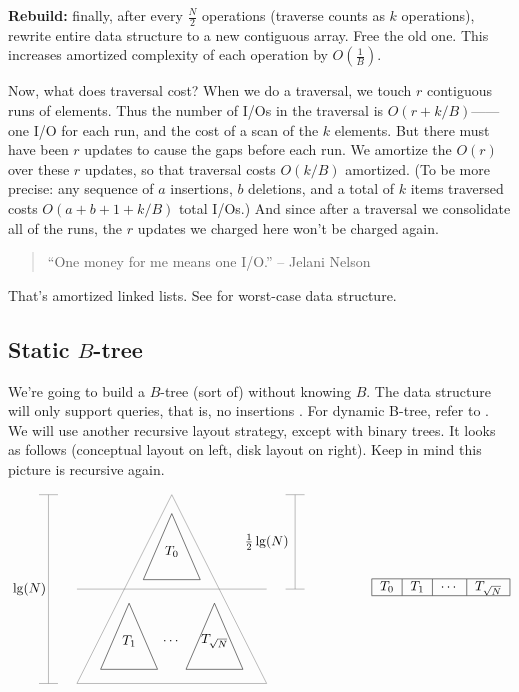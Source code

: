 \documentclass[11pt]{article}
\begin{document}
\textbf{Rebuild:} finally, after every $\frac{N}{2}$ operations (traverse counts as $k$ operations), 
rewrite entire data structure to a new contiguous array. Free the old one. 
This increases amortized complexity of each operation by $O(\frac{1}{B})$. 

Now, what does traversal cost? When we do a traversal, we touch $r$
contiguous runs of elements. Thus the number of I/Os in the traversal
is $O(r + k/B)$------one I/O for each run, and the cost of a scan of the $k$
elements. But there must have been $r$ updates to cause the gaps
before each run. We amortize the $O(r)$ over these $r$ updates, so
that traversal costs $O(k/B)$ amortized. (To be more precise: any
sequence of $a$ insertions, $b$ deletions, and a total of $k$ items
traversed costs $O(a + b + 1 + k/B)$ total I/Os.) And since after a
traversal we consolidate all of the runs, the $r$ updates we charged
here won't be charged again.

\begin{quote}
  ``One money for me means one I/O.'' -- Jelani Nelson
\end{quote}

That's amortized linked lists. See \cite{bender2002two} for worst-case data structure.

\subsection{Static $B$-tree}

We're going to build a $B$-tree (sort of) without knowing $B$. The
data structure will only support queries, that is, no insertions
\cite{frigo1999cache}. For dynamic B-tree, refer to \cite{bender2005cache}. We will use another recursive layout strategy,
except with binary trees. It looks as follows (conceptual layout on
left, disk layout on right). Keep in mind this picture is recursive
again.

\[
\begin{tikzpicture}[scale = 2.5, baseline=70pt]
  \draw[gray] (1,2) -- (0,0) -- (2,0) -- (1,2);
  \draw (1,1.8) -- (0.7,1.1) -- (1.3,1.1) -- (1,1.8);
  \draw (0.55,0.85) -- (0.25,0.15) -- (0.85,0.15) -- (0.55,0.85);
  \draw (1.45,0.85) -- (1.15,0.15) -- (1.75,0.15) -- (1.45,0.85);

  \draw (1,1.4) node {$T_0$};
  \draw (.55,.45) node {$T_1$};
  \draw (1.45,.45) node {$T_{\sqrt{N}}$};
  \draw (1,.45) node {$\cdots$};

  \draw[gray] (0,1) -- (2,1);

  \draw[gray] (-.3,0) -- (-.3,2);
  \draw[gray] (-.4,0) -- (-.2,0);
  \draw[gray] (-.4,2) -- (-.2,2);
  \draw (-.5,1) node {$\lg(N)$};

  \draw[gray] (2.3,1) -- (2.3,2);
  \draw[gray] (2.2,1) -- (2.4,1);
  \draw[gray] (2.2,2) -- (2.4,2);
  \draw (2.0,1.5) node {$\frac{1}{2}\lg(N)$};
\end{tikzpicture}
\hspace{50pt}
\begin{tabular}{|c|c|c|c|}
  \hline $T_0$ & $T_1$ & $\cdots$ & $T_{\sqrt{N}}$ \\ \hline
\end{tabular}
\]
\end{document}
